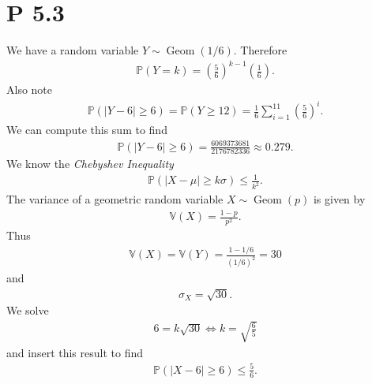 \documentclass{article}
\renewcommand{\P}{\mathbb{P}}
\newcommand{\V}{\mathbb{V}}
\DeclareMathOperator{\Geom}{Geom}
\begin{document}
\section{P 5.3}
We have a random variable $Y\sim\Geom(1/6)$. Therefore 
\begin{align*}
  \P(Y=k) = \left(\frac{5}{6}\right)^{k-1}\left(\frac{1}{6}\right).
\end{align*}
Also note
\begin{align*}
  \P(|Y-6|\geq 6) = \P(Y \geq 12) = \frac{1}{6}\sum_{i=1}^{11} \left(\frac{5}{6}\right)^i.
\end{align*}
We can compute this sum to find
\begin{align*}
  \P(|Y-6|\geq 6) = \frac{6069373681}{2176782336} \approx 0.279.
\end{align*}
We know the \emph{Chebyshev Inequality}
\begin{align*}
  \P(|X-\mu|\geq k\sigma) \leq \frac{1}{k^2}.
\end{align*}
The variance of a geometric random variable $X\sim\Geom(p)$ is given by
\begin{align*}
  \V(X) = \frac{1-p}{p^2}.
\end{align*}
Thus
\begin{align*}
  \V(X) = \V(Y) = \frac{1-1/6}{(1/6)^2} = 30
\end{align*}
and
\begin{align*}
  \sigma_X = \sqrt{30}.
\end{align*}
We solve
\begin{align*}
  6 = k\sqrt{30} \Leftrightarrow k = \sqrt{\frac{6}{5}}
\end{align*}
and insert this result to find
\begin{align*}
  \P(|X-6| \geq 6) \leq \frac{5}{6}.
\end{align*}
\end{document}
